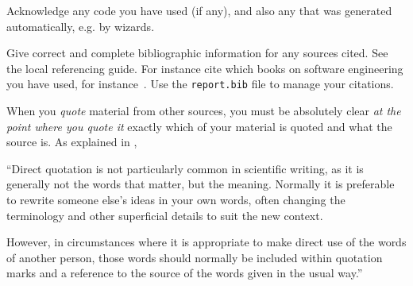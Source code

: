 \documentclass[10pt]{report}
\begin{document}
Acknowledge any code you have used (if any), and also any that was
generated automatically, e.g. by wizards.

Give correct and complete bibliographic information for any sources
cited. See the local referencing guide. For instance cite which
books on software engineering you have used, for
instance~\cite{software-design}. Use the \texttt{report.bib} file to
manage your citations.

When you \emph{quote} material from other sources, you must be
absolutely clear \emph{at the point where you quote it} exactly
which of your material is quoted and what the source is. As
explained in \cite{SoCS:plagiarism},

``Direct quotation is not particularly common in scientific writing,
as it is generally not the words that matter, but the meaning.
Normally it is preferable to rewrite someone else's ideas in your
own words, often changing the terminology and other superficial
details to suit the new context.

However, in circumstances where it is appropriate to make direct use
of the words of another person, those words should normally be
included within quotation marks and a reference to the source of the
words given in the usual way.''
\end{document}
